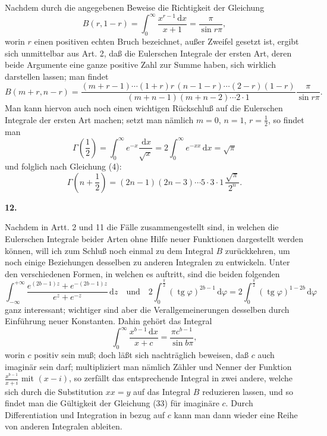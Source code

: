 \documentclass[11pt]{article}
\newcommand{\dd}{\,\mathrm d}
\newcommand{\tg}{\operatorname{tg}}
\newcommand{\art}[1]{\bigskip\begin{center}\large\bfseries #1.\end{center}\nopagebreak}
\begin{document}
Nachdem durch die angegebenen Beweise die Richtigkeit der Gleichung
\[
B(r,1-r)=\int_0^\infty\frac{x^{r-1}\dd x}{x+1}
=\frac{\pi}{\sin r\pi},
\]
worin $r$ einen positiven echten Bruch bezeichnet, außer Zweifel gesetzt ist, ergibt sich unmittelbar aus Art. 2, daß die Eulerschen Integrale der ersten Art, deren beide Argumente eine ganze positive Zahl zur Summe haben, sich wirklich darstellen lassen; man findet
\begin{equation}
B(m+r,n-r)=
\frac{(m+r-1)\cdots(1+r)r\,(n-1-r)\cdots(2-r)(1-r)}
     {(m+n-1)(m+n-2)\cdots2\cdot1}
\frac{\pi}{\sin r\pi}.
\tag{30}
\end{equation}
Man kann hiervon auch noch einen wichtigen Rückschluß auf die Eulerschen Integrale der ersten Art machen; setzt man nämlich $m=0$, $n=1$, $r=\frac12$, so findet man
\begin{equation}
\Gamma\!\left(\frac12\right)
=\int_0^\infty e^{-x}\frac{\dd x}{\sqrt{x}}
=2\int_0^\infty e^{-xx}\dd x=\sqrt{\pi}
\tag{31}
\end{equation}
und folglich nach Gleichung (4):
\begin{equation}
\Gamma\!\left(n+\frac12\right)
=(2n-1)(2n-3)\cdots5\cdot3\cdot1\,\frac{\sqrt{\pi}}{2^n}.
\tag{32}
\end{equation}

\art{12}

Nachdem in Artt. 2 und 11 die Fälle zusammengestellt sind, in welchen die Eulerschen Integrale beider Arten ohne Hilfe neuer Funktionen dargestellt werden können, will ich zum Schluß noch einmal zu dem Integral $B$ zurückkehren, um noch einige Beziehungen desselben zu anderen Integralen zu entwickeln. Unter den verschiedenen Formen, in welchen es auftritt, sind die beiden folgenden
\[
\int_{-\infty}^{+\infty}
\frac{e^{(2b-1)z}+e^{-(2b-1)z}}{e^z+e^{-z}}\dd z
\quad\text{und}\quad
2\int_0^{\frac{\pi}{2}}(\tg\varphi)^{2b-1}\dd\varphi
=2\int_0^{\frac{\pi}{2}}(\tg\varphi)^{1-2b}\dd\varphi
\]
ganz interessant; wichtiger sind aber die Verallgemeinerungen desselben durch Einführung neuer Konstanten. Dahin gehört das Integral
\begin{equation}
\int_0^\infty\frac{x^{b-1}\dd x}{x+c}
=\frac{\pi c^{b-1}}{\sin b\pi},
\tag{33}
\end{equation}
worin $c$ positiv sein muß; doch läßt sich nachträglich beweisen, daß $c$ auch imaginär sein darf; multipliziert man nämlich Zähler und Nenner der Funktion $\frac{x^{b-1}}{x+i}$ mit $(x-i)$, so zerfällt das entsprechende Integral in zwei andere, welche sich durch die Substitution $xx=y$ auf das Integral $B$ reduzieren lassen, und so findet man die Gültigkeit der Gleichung (33) für imaginäre $c$. Durch Differentiation und Integration in bezug auf $c$ kann man dann wieder eine Reihe von anderen Integralen ableiten.
\end{document}
